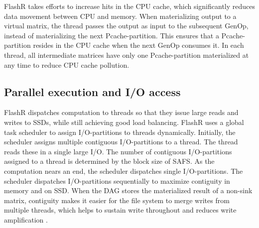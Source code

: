 FlashR takes efforts to increase hits in the CPU cache, which 
significantly reduces data movement between CPU and memory.
When materializing output to a virtual matrix, the thread passes
the output as input to the subsequent
GenOp, instead of materializing the next Pcache-partition.
This ensures that a Pcache-partition resides in the CPU cache
when the next GenOp consumes it. 
In each thread, all intermediate matrices have only one 
Pcache-partition materialized
at any time to reduce CPU cache pollution.




\subsection{Parallel execution and I/O access}
FlashR dispatches computation to threads so that they
issue large reads and writes to SSDs, while still achieving good load balancing.
FlashR uses a global task scheduler to assign I/O-partitions to threads
dynamically. Initially, the scheduler assigns multiple contiguous I/O-partitions
to a thread. The thread reads these in a single large I/O.
The number of contiguous I/O-partitions assigned to a thread is determined by
the block size of SAFS.
As the computation nears an end, the scheduler dispatches single I/O-partitions. 
The scheduler dispatches I/O-partitions sequentially to maximize contiguity in memory
and on SSD. When the DAG stores the materialized result of a non-sink matrix,
contiguity makes it easier for the file system to merge
writes from multiple threads, which helps to sustain write throughout and reduces
write amplification \cite{ripq}.


